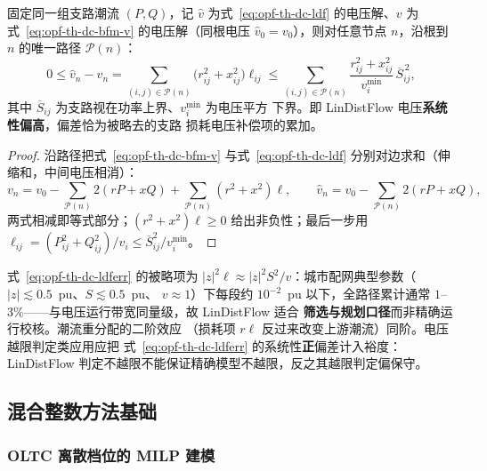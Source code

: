 \begin{proposition}\label{prop:opf-th-dc-ldferr}
固定同一组支路潮流 $(P,Q)$，记 $\hat v$ 为式~\eqref{eq:opf-th-dc-ldf}
的电压解、$v$ 为式~\eqref{eq:opf-th-dc-bfm-v} 的电压解（同根电压
$\hat v_0=v_0$），则对任意节点 $n$，沿根到 $n$ 的唯一路径
$\mathcal P(n)$：
\begin{equation}
0\le \hat v_n-v_n
=\sum_{(i,j)\in\mathcal P(n)}\bigl(r_{ij}^2+x_{ij}^2\bigr)\ell_{ij}
\le\sum_{(i,j)\in\mathcal P(n)}
\frac{r_{ij}^2+x_{ij}^2}{v_i^{\min}}\,\overline S_{ij}^{\,2},
\label{eq:opf-th-dc-ldferr}
\end{equation}
其中 $\overline S_{ij}$ 为支路视在功率上界、$v_i^{\min}$ 为电压平方
下界。即 LinDistFlow 电压\textbf{系统性偏高}，偏差恰为被略去的支路
损耗电压补偿项的累加。
\end{proposition}

\begin{proof}
沿路径把式~\eqref{eq:opf-th-dc-bfm-v} 与式~\eqref{eq:opf-th-dc-ldf}
分别对边求和（伸缩和，中间电压相消）：
\begin{equation}
v_n=v_0-\sum_{\mathcal P(n)}2(rP+xQ)
+\sum_{\mathcal P(n)}(r^2+x^2)\ell,\qquad
\hat v_n=v_0-\sum_{\mathcal P(n)}2(rP+xQ),
\end{equation}
两式相减即等式部分；$(r^2+x^2)\ell\ge0$ 给出非负性；最后一步用
$\ell_{ij}=(P_{ij}^2+Q_{ij}^2)/v_i\le\overline S_{ij}^2/v_i^{\min}$。
\end{proof}

\begin{remark}[误差量级与适用范围]\label{rem:opf-th-dc-ldfrem}
式~\eqref{eq:opf-th-dc-ldferr} 的被略项为 $|z|^2\ell\approx
|z|^2 S^2/v$：城市配网典型参数（$|z|\lesssim0.5$~pu、$S\lesssim0.5$~pu、
$v\approx1$）下每段约 $10^{-2}$~pu 以下，全路径累计通常
$1$--$3\%$——与电压运行带宽同量级，故 LinDistFlow 适合
\textbf{筛选与规划口径}而非精确运行校核。潮流重分配的二阶效应
（损耗项 $r\ell$ 反过来改变上游潮流）同阶。电压越限判定类应用应把
式~\eqref{eq:opf-th-dc-ldferr} 的系统性\textbf{正}偏差计入裕度：
LinDistFlow 判定不越限不能保证精确模型不越限，反之其越限判定偏保守。
\end{remark}

\subsection{混合整数方法基础}\label{sec:opf-th-dc-mip}

\subsubsection{OLTC 离散档位的 MILP 建模}

